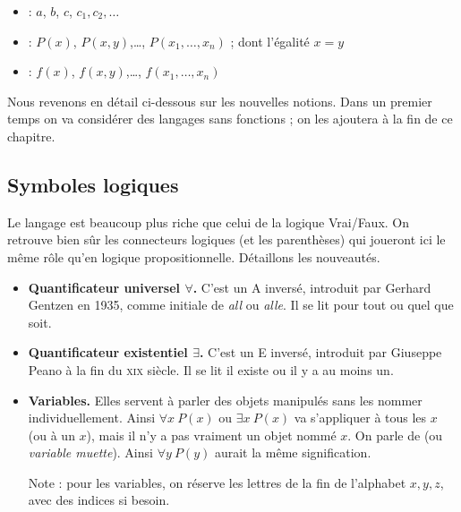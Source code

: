 \documentclass[11pt,class=report,crop=false]{standalone}
\begin{document}
\begin{itemize}
	\item {} : $a$, $b$, $c$, $c_1, c_2, \ldots$
	
	\item {} : $P(x)$, $P(x,y)$,\ldots, $P(x_1,\ldots,x_n)$ ; dont l'égalité $x=y$
	
	\item {} : $f(x)$, $f(x,y)$,\ldots, $f(x_1,\ldots,x_n)$
\end{itemize}

Nous revenons en détail ci-dessous sur les nouvelles notions.
Dans un premier temps on va considérer des langages sans fonctions ; on les ajoutera à la fin de ce chapitre.

\subsection{Symboles logiques}

Le langage est beaucoup plus riche que celui de la logique Vrai/Faux. 
On retrouve bien sûr les connecteurs logiques (et les parenthèses) qui joueront ici le même rôle qu'en logique propositionnelle.
Détaillons les nouveautés.

\begin{itemize}
	\item \textbf{Quantificateur universel $\forall$.}
	C'est un A inversé, introduit par Gerhard Gentzen en 1935, comme initiale de \emph{all} ou \emph{alle}. 
	Il se lit \og{}pour tout\fg{} ou \og{}quel que soit\fg{}.
	
	\item \textbf{Quantificateur existentiel $\exists$.}
	C'est un E inversé, introduit par Giuseppe Peano à la fin du \textsc{xix}\ieme{} siècle. 
	Il se lit \og{}il existe\fg{} ou \og{}il y a au moins un\fg{}.
	
	\item \textbf{Variables.}
	Elles servent à parler des objets manipulés sans les nommer individuellement.
	Ainsi \og{}$\forall x \ P(x)$\fg{} ou \og{}$\exists x \ P(x)$\fg{} va s'appliquer à tous les $x$ (ou à un $x$), mais il n'y a pas vraiment un objet nommé $x$. On parle de  (ou \emph{variable muette}). Ainsi \og{}$\forall y \ P(y)$\fg{} aurait la même signification.
	
	Note : pour les variables, on réserve les lettres de la fin de l'alphabet $x,y,z$, avec des indices si besoin.
\end{itemize}
\end{document}
